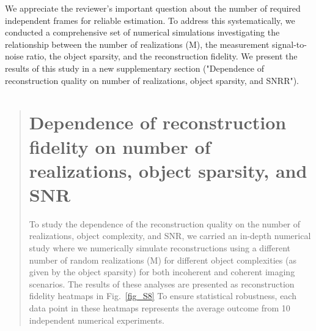 \documentclass[12pt]{article}
\newenvironment{ourresponse}
    {\begin{tcolorbox}[width=\linewidth,breakable,enhanced,colback=gray!5,colframe=responsecolor!50,title=Response,left=5pt,right=5pt]}
    {\end{tcolorbox}}
\begin{document}
\begin{ourresponse}
    We appreciate the reviewer's important question about the number of required independent frames for reliable estimation. To address this systematically, we conducted a comprehensive set of numerical simulations investigating the relationship between the number of realizations (M), the measurement signal-to-noise ratio, the object sparsity, and the reconstruction fidelity. We present the results of this study in a new supplementary section ("Dependence of reconstruction quality on number of realizations, object sparsity, and SNRR").

    \begin{quote}
        \setcounter{section}{2221}
        \section{Dependence of reconstruction fidelity on number of realizations, object sparsity, and SNR}

        To study the dependence of the reconstruction quality on the number of realizations, object complexity, and SNR, we carried an in-depth numerical study where we numerically simulate reconstructions using a different number of random realizations (M) for different object complexities (as given by the object sparsity) for both incoherent and coherent imaging scenarios.
        The results of these analyses are presented as reconstruction fidelity heatmaps in Fig.~\ref{fig_S8}
        To ensure statistical robustness, each data point in these heatmaps represents the average outcome from 10 independent numerical experiments.


\end{quote}
\end{ourresponse}
\end{document}
